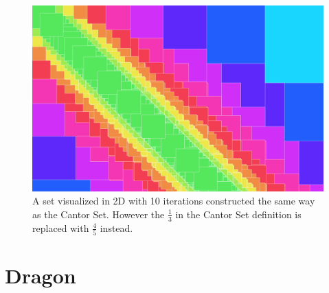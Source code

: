 \documentclass[11pt]{ekblite}
\begin{document}
	\begin{figure}[h]
		\includegraphics[scale=0.2]{img/c9.jpg}
		\caption{A set visualized in 2D with 10 iterations constructed the same way as the Cantor Set. However the $\frac{1}{3}$ in the Cantor Set definition is replaced with $\frac{4}{5}$ instead.}
	\end{figure}
\newpage
\section{Dragon}

\newpage

\end{document}
